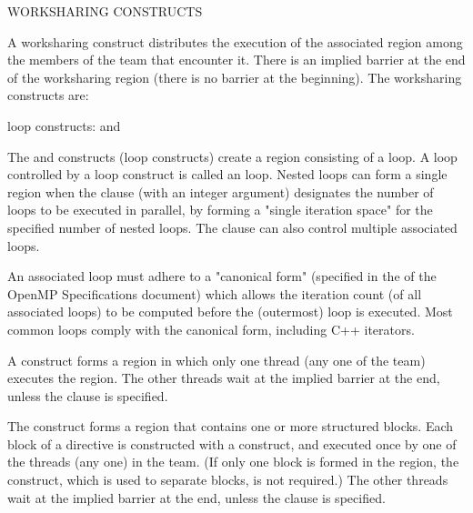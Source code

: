 \bigskip
WORKSHARING CONSTRUCTS

A worksharing construct distributes the execution of the associated region
among the members of the team that encounter it.  There is an
implied barrier at the end of the worksharing region
(there is no barrier at the beginning). The worksharing
constructs are:

\begin{compactitem}

\item loop constructs: { and  }
\item {}
\item {}
\item {}

\end{compactitem}

The  and  constructs (loop constructs) create a region 
consisting of a loop.  A loop controlled by a loop construct is called 
an  loop.  Nested loops can form a single region when the 
 clause (with an integer argument) designates the number of 
 loops to be executed in parallel, by forming a 
"single iteration space" for the specified number of nested loops.  
The  clause can also control multiple associated loops.

An associated loop must adhere to a "canonical form" (specified in the 
 of the OpenMP Specifications document) which allows the 
iteration count (of all associated loops) to be computed before the 
(outermost) loop is executed. %
Most common loops comply with the canonical form, including C++ iterators.

A  construct forms a region in which only one thread (any one 
of the team) executes the region. 
The other threads wait at the implied 
barrier at the end, unless the  clause is specified.

The  construct forms a region that contains one or more 
structured blocks.  Each block of a  directive is 
constructed with a  construct, and executed once by 
one of the threads (any one) in the team.  (If only one block is 
formed in the region, the  construct, which is used to
separate blocks, is not required.)
The other threads wait at the implied 
barrier at the end, unless the  clause is specified.


